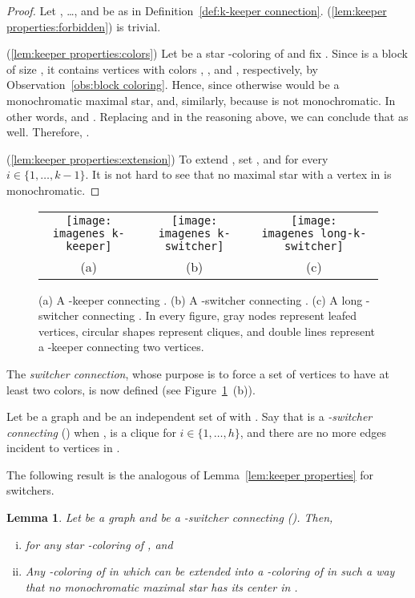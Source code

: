 \documentclass[a4paper, 11pt, oneside]{article}
\newtheorem{lemma}[theorem]{Lemma}
\newcommand{\range}[3]{\ensuremath{#1 \in \{#2,\ldots,#3\}}}
\let\Definition=\emph
\def\imagenes{}
\begin{document}
\begin{proof}
Let , \ldots,  and  be as in Definition~\ref{def:k-keeper connection}.  (\ref{lem:keeper properties:forbidden}) is trivial.  

(\ref{lem:keeper properties:colors}) Let  be a star -coloring of  and fix .  Since  is a block of size , it contains vertices  with colors , , and , respectively, by Observation~\ref{obs:block coloring}.  Hence,  since otherwise  would be a monochromatic maximal star, and, similarly,  because  is not monochromatic. In other words,  and .  Replacing  and  in the reasoning above, we can conclude that  as well.  Therefore, .

(\ref{lem:keeper properties:extension}) To extend , set , and  for every \range{i}{1}{k-1}.  It is not hard to see that no maximal star with a vertex in  is monochromatic.
\end{proof}

\begin{figure}
 \centering
 \begin{tabular}{ccc}
 \texttt{[image: \\imagenes k-keeper]} & \texttt{[image: \\imagenes k-switcher]} & \texttt{[image: \\imagenes long-k-switcher]}\\
 (a) & (b) & (c)
 \end{tabular}
 \caption{(a) A -keeper connecting .  (b) A -switcher connecting . (c) A long -switcher connecting .  In every figure, gray nodes represent leafed vertices, circular shapes represent cliques, and double lines represent a -keeper connecting two vertices.}\label{fig:keeper-switcher}
\end{figure}


The \Definition{switcher connection}, whose purpose is to force a set of vertices to have at least two colors, is now defined (see Figure~\ref{fig:keeper-switcher}~(b)).

\begin{defn}[-switcher]\label{def:switcher}
  Let  be a graph and  be an independent set of  with .  Say that  is a \Definition{-switcher connecting } () when ,  is a clique for \range{i}{1}{h}, and there are no more edges incident to vertices in .
\end{defn}

The following result is the analogous of Lemma~\ref{lem:keeper properties} for switchers.

\begin{lemma}\label{lem:switcher properties}
 Let  be a graph and  be a -switcher connecting  (). Then,
\begin{enumerate}[(i)]
  \item  for any star -coloring  of , and \label{lem:switcher properties:colors}
  \item Any -coloring  of  in which  can be extended into a -coloring of  in such a way that no monochromatic maximal star has its center in .\label{lem:switcher properties:extension}
\end{enumerate}
\end{lemma}
\end{document}
